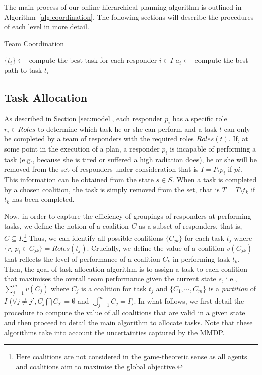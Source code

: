 The main process of our online hierarchical planning algorithm is
outlined in Algorithm~\ref{alg:coordination}. The following
sections will describe the procedures of each level in more detail.

\begin{algorithm}[t]
  \caption{Team Coordination}\small
  \label{alg:coordination}
  \Indm
  \Indp\BlankLine
  $\{ t_i \} \gets$ compute the best task for each responder $i\in I$ \;
   {
    $a_i \gets$ compute the best path to task $t_i$ \;
  }
\end{algorithm}

\subsection{Task Allocation}
\label{sec:taskplanning}

\noindent As described in Section \ref{sec:model}, each responder
$p_i$ has a specific role $r_i \in Roles$ to determine which task
he or she can perform and  a task $t$ can only be completed by a
team of responders with the required roles $Roles(t)$. If, at some
point in the execution of a plan, a responder $p_i$ is incapable of
performing a task (e.g., because she is tired or suffered a high
radiation does), he or she will be removed from the set of
responders under consideration that is $I = I \setminus p_i$ if
$pi$. This information can be obtained from the state $s \in S$.
When a task is completed by a chosen coalition, the task is simply
removed from the set, that is $T = T\setminus t_k$ if $t_k$ has
been completed.

Now, in order to capture the efficiency of groupings of responders
at performing tasks, we define the notion of a coalition $C$ as a
subset of responders, that is, $C \subseteq I$.\footnote{Here
coalitions are not considered in the game-theoretic sense as all
agents and coalitions aim to maximise the global objective.} Thus,
we can identify all possible coalitions $\{ C_{jk} \}$ for each
task $t_j$ where $\{r_i | p_i \in C_{jk}\} = Roles(t_j)$.
Crucially, we define the value of a coalition $v(C_{jk})$ that
reflects the level of performance of a coalition $C_k$ in
performing task $t_k$.  Then, the goal of task allocation algorithm
is to assign a task to each coalition that maximises the overall
team performance given the current state $s$, i.e., $\sum_{j=1}^m
v(C_j)$ where $C_j$ is a coalition for task $t_j$ and $\{ C_1,
\cdots, C_m \}$ is a {\em partition} of $I$ ($\forall j\neq j', C_j
\bigcap C_{j'} = \emptyset$ and $\bigcup_{j=1}^m C_j=I$). In what
follows, we first detail the procedure to compute the value of all
coalitions that are valid in a given state and then proceed to
detail the main algorithm to allocate tasks. Note that these
algorithms take into account the uncertainties captured by the
MMDP.


